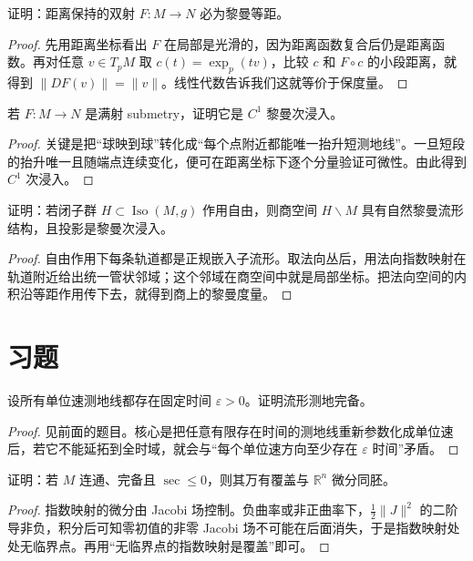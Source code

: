 \documentclass[11pt,a4paper,openany]{ctexbook}
\numberwithin{equation}{chapter}
\begin{document}
\begin{problem}
证明：距离保持的双射 \(F\colon M\to N\) 必为黎曼等距。
\end{problem}
\begin{proof}
先用距离坐标看出 \(F\) 在局部是光滑的，因为距离函数复合后仍是距离函数。再对任意 \(v\in T_pM\) 取 \(c(t)=\exp_p(tv)\)，比较 \(c\) 和 \(F\circ c\) 的小段距离，就得到 \(\lVert DF(v)\rVert=\lVert v\rVert\)。线性代数告诉我们这就等价于保度量。
\end{proof}

\begin{problem}
若 \(F\colon M\to N\) 是满射 submetry，证明它是 \(C^1\) 黎曼次浸入。
\end{problem}
\begin{proof}
关键是把“球映到球”转化成“每个点附近都能唯一抬升短测地线”。一旦短段的抬升唯一且随端点连续变化，便可在距离坐标下逐个分量验证可微性。由此得到 \(C^1\) 次浸入。
\end{proof}

\begin{problem}
证明：若闭子群 \(H\subset \operatorname{Iso}(M,g)\) 作用自由，则商空间 \(H\backslash M\) 具有自然黎曼流形结构，且投影是黎曼次浸入。
\end{problem}
\begin{proof}
自由作用下每条轨道都是正规嵌入子流形。取法向丛后，用法向指数映射在轨道附近给出统一管状邻域；这个邻域在商空间中就是局部坐标。把法向空间的内积沿等距作用传下去，就得到商上的黎曼度量。
\end{proof}

\section{习题}

\begin{exercise}
设所有单位速测地线都存在固定时间 \(\varepsilon>0\)。证明流形测地完备。
\end{exercise}
\begin{proof}
见前面的题目。核心是把任意有限存在时间的测地线重新参数化成单位速后，若它不能延拓到全时域，就会与“每个单位速方向至少存在 \(\varepsilon\) 时间”矛盾。
\end{proof}

\begin{exercise}
证明：若 \(M\) 连通、完备且 \(\sec\le 0\)，则其万有覆盖与 \(\mathbb R^n\) 微分同胚。
\end{exercise}
\begin{proof}
指数映射的微分由 Jacobi 场控制。负曲率或非正曲率下，\(\frac12\lVert J\rVert^2\) 的二阶导非负，积分后可知零初值的非零 Jacobi 场不可能在后面消失，于是指数映射处处无临界点。再用“无临界点的指数映射是覆盖”即可。
\end{proof}
\end{document}
